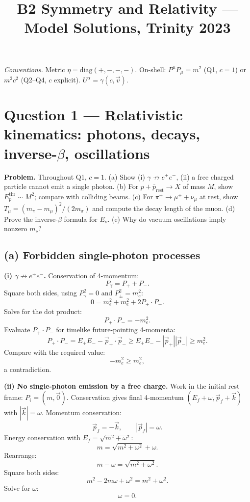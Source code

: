 \documentclass[11pt]{article}
\title{B2 Symmetry and Relativity --- Model Solutions, Trinity 2023}
\author{}
\date{}
\begin{document}
\maketitle

\noindent\textit{Conventions.} Metric $\eta=\mathrm{diag}(+,-,-,-)$. On-shell: $P^{\mu}P_{\mu}=m^{2}$ (Q1, $c=1$) or $m^{2}c^{2}$ (Q2--Q4, $c$ explicit). $U^{\alpha}=\gamma(c,\vec v)$.

\section*{Question 1 --- Relativistic kinematics: photons, decays, inverse-$\beta$, oscillations}

\textbf{Problem.} Throughout Q1, $c=1$. (a) Show (i) $\gamma\not\to e^{+}e^{-}$, (ii) a free charged particle cannot emit a single photon. (b) For $p+\bar p_{\text{rest}}\to X$ of mass $M$, show $E_{p}^{\text{thr}}\sim M^{2}$; compare with colliding beams. (c) For $\pi^{+}\to\mu^{+}+\nu_{\mu}$ at rest, show $T_{\mu}=(m_{\pi}-m_{\mu})^{2}/(2m_{\pi})$ and compute the decay length of the muon. (d) Prove the inverse-$\beta$ formula for $E_{\nu}$. (e) Why do vacuum oscillations imply nonzero $m_{\nu}$?

\subsection*{(a) Forbidden single-photon processes}

\textbf{(i) $\gamma\not\to e^{+}e^{-}$.} Conservation of 4-momentum:
\[ P_{\gamma}=P_{+}+P_{-}. \]
Square both sides, using $P_{\gamma}^{2}=0$ and $P_{\pm}^{2}=m_{e}^{2}$:
\[ 0=m_{e}^{2}+m_{e}^{2}+2P_{+}\!\cdot\!P_{-}. \]
Solve for the dot product:
\[ P_{+}\!\cdot\!P_{-}=-m_{e}^{2}. \]
Evaluate $P_{+}\!\cdot\!P_{-}$ for timelike future-pointing 4-momenta:
\[ P_{+}\!\cdot\!P_{-}=E_{+}E_{-}-\vec p_{+}\!\cdot\!\vec p_{-}\geq E_{+}E_{-}-|\vec p_{+}||\vec p_{-}|\geq m_{e}^{2}. \]
Compare with the required value:
\[ -m_{e}^{2}\geq m_{e}^{2}, \]
a contradiction. 

\textbf{(ii) No single-photon emission by a free charge.} Work in the initial rest frame: $P_{i}=(m,\vec 0)$. Conservation gives final 4-momentum $(E_{f}+\omega,\vec p_{f}+\vec k)$ with $|\vec k|=\omega$. Momentum conservation:
\[ \vec p_{f}=-\vec k,\qquad |\vec p_{f}|=\omega. \]
Energy conservation with $E_{f}=\sqrt{m^{2}+\omega^{2}}$:
\[ m=\sqrt{m^{2}+\omega^{2}}+\omega. \]
Rearrange:
\[ m-\omega=\sqrt{m^{2}+\omega^{2}}. \]
Square both sides:
\[ m^{2}-2m\omega+\omega^{2}=m^{2}+\omega^{2}. \]
Solve for $\omega$:
\[ \omega=0. \]
\end{document}
